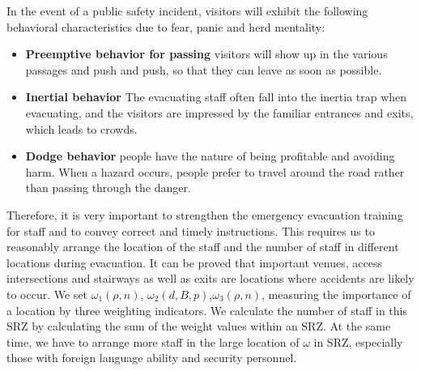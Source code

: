 In the event of a public safety incident, visitors will exhibit the following behavioral characteristics due to fear, panic and herd mentality:
\begin{itemize}
\item \textbf{Preemptive behavior for passing} visitors will show up in the various passages and push and push, so that they can leave as soon as possible.
\item \textbf{Inertial behavior} The evacuating staff often fall into the inertia trap when evacuating, and the visitors are impressed by the familiar entrances and exits, which leads to crowds.
\item \textbf{Dodge behavior} people have the nature of being profitable and avoiding harm. When a hazard occurs, people prefer to travel around the road rather than passing through the danger.
\end{itemize}

Therefore, it is very important to strengthen the emergency evacuation training for staff and to convey correct and timely instructions. This requires us to reasonably arrange the location of the staff and the number of staff in different locations during evacuation. It can be proved that important venues, access intersections and stairways as well as exits are locations where accidents are likely to occur. We set $\omega_1(\rho,n)$, $\omega_2(d,B,p)$,$\omega_3(\rho,n)$, measuring the importance of a location by three weighting indicators. We calculate the number of staff in this SRZ by calculating the sum of the weight values within an SRZ. At the same time, we have to arrange more staff in the large location of $\omega$ in SRZ, especially those with foreign language ability and security personnel.





